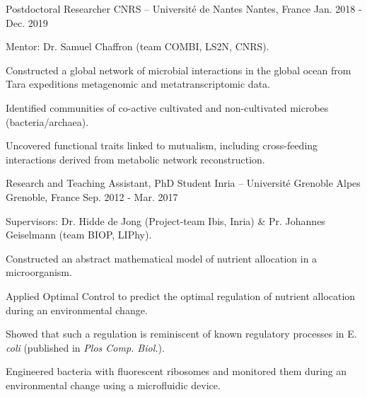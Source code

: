 

\begin{cventries}

  \cventry
    {Postdoctoral Researcher} %
    {CNRS -- Université de Nantes} %
    {Nantes, France} %
    {Jan. 2018 - Dec. 2019} %
    {
	Mentor: Dr. Samuel Chaffron (team COMBI, LS2N, CNRS).
    \vspace{0.5cm}
	\begin{cvitems} %
		\item {Constructed a global network of microbial interactions in the global ocean from Tara expeditions metagenomic and metatranscriptomic data.}
		\item {Identified communities of co-active cultivated and non-cultivated microbes (bacteria/archaea).}
		\item {Uncovered functional traits linked to mutualism, including cross-feeding interactions derived from metabolic network reconstruction.} 
	\end{cvitems}
    }
    
  \cventry
    {Research and Teaching Assistant, PhD Student} %
    {Inria -- Université Grenoble Alpes} %
    {Grenoble, France} %
    {Sep. 2012 - Mar. 2017} %
    {
	Supervisors: Dr. Hidde de Jong (Project-team Ibis, Inria) \& Pr. Johannes Geiselmann (team BIOP, LIPhy).
    \vspace{0.5cm}
	\begin{cvitems} %
        \item {Constructed an abstract mathematical model of nutrient allocation in a microorganism.}
        \item {Applied Optimal Control to predict the optimal regulation of nutrient allocation during an environmental change.}
        \item {Showed that such a regulation is reminiscent of known regulatory processes in E. \textit{coli} (published in \textit{Plos Comp. Biol.}).}
		\item {Engineered bacteria with fluorescent ribosomes and monitored them during an environmental change using a microfluidic device.}
	\end{cvitems}
    }
\end{cventries}    

